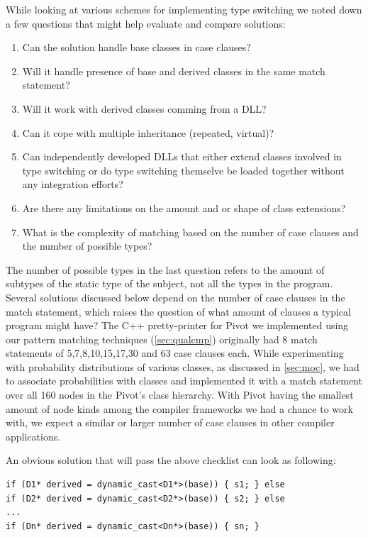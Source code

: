 \documentclass[preprint]{sigplanconf}
\begin{document}
While looking at various schemes for implementing type switching we noted down a 
few questions that might help evaluate and compare solutions: 

\begin{enumerate}
\item Can the solution handle base classes in case clauses?
\item Will it handle presence of base and derived classes in the same match statement?
\item Will it work with derived classes comming from a DLL?
\item Can it cope with multiple inheritance (repeated, virtual)?
\item Can independently developed DLLs that either extend classes involved in 
      type switching or do type switching themselve be loaded together without 
      any integration efforts?
\item Are there any limitations on the amount and or shape of class extensions?
\item What is the complexity of matching based on the number of case clauses and 
      the number of possible types?
\end{enumerate}

The number of possible types in the last question refers to the amount of subtypes 
of the static type of the subject, not all the types in the program. Several 
solutions discussed below depend on the number of case clauses in the match 
statement, which raises the question of what amount of clauses a typical program 
might have? The C++ pretty-printer for Pivot we implemented using our pattern 
matching techniques (\textsection\ref{sec:qualcmp}) originally had 8 match 
statements of 5,7,8,10,15,17,30 and 63 case clauses each. While experimenting 
with probability distributions of various classes, as discussed in 
\textsection\ref{sec:moc}, we had to associate probabilities with classes and 
implemented it with a match statement over all 160 nodes in the Pivot's class 
hierarchy. With Pivot having the smallest amount of node kinds among the 
compiler frameworks we had a chance to work with, we expect a similar or larger 
number of case clauses in other compiler applications.

An obvious solution that will pass the above checklist can look as following:

\begin{lstlisting}
if (D1* derived = dynamic_cast<D1*>(base)) { s1; } else
if (D2* derived = dynamic_cast<D2*>(base)) { s2; } else
...
if (Dn* derived = dynamic_cast<Dn*>(base)) { sn; }
\end{lstlisting}
\end{document}
